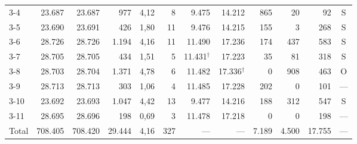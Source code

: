{\begin{longtable}{@{}lrrrrrrrrrrc@{}}
3-4 & 23.687 & 23.687 & 977 & 4,12 & 8 & 9.475 & 14.212 & 865 & 20 & 92 & S \\
3-5 & 23.690 & 23.691 & 426 & 1,80 & 11 & 9.476 & 14.215 & 155 & 3 & 268 & S \\
3-6 & 28.726 & 28.726 & 1.194 & 4,16 & 11 & 11.490 & 17.236 & 174 & 437 & 583 & S \\
3-7 & 28.705 & 28.705 & 434 & 1,51 & 5 & 11.431$^{\dagger}$ & 17.223 & 35 & 81 & 318 & S \\
3-8 & 28.703 & 28.704 & 1.371 & 4,78 & 6 & 11.482 & 17.336$^{\dagger}$ & 0 & 908 & 463 & O \\
3-9 & 28.713 & 28.713 & 303 & 1,06 & 4 & 11.485 & 17.228 & 202 & 0 & 101 & --- \\
3-10 & 23.692 & 23.693 & 1.047 & 4,42 & 13 & 9.477 & 14.216 & 188 & 312 & 547 & S \\
3-11 & 28.695 & 28.696 & 198 & 0,69 & 3 & 11.478 & 17.218 & 0 & 0 & 198 & --- \\
\midrule
Total & 708.405 & 708.420 & 29.444 & 4,16 & 327 & --- & --- & 7.189 & 4.500 & 17.755 & --- \\
\end{longtable}
}
